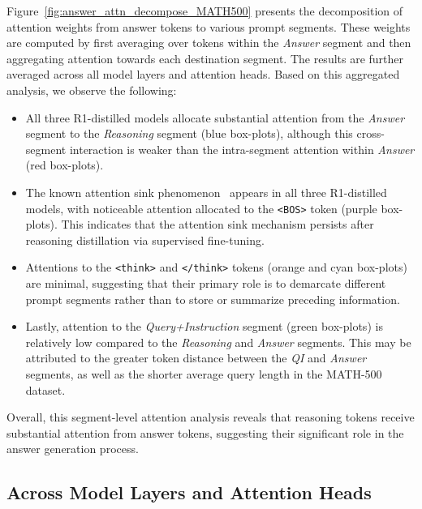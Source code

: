 \documentclass[11pt]{article}
\begin{document}
Figure~\ref{fig:answer_attn_decompose_MATH500} presents the decomposition of attention weights from answer tokens to various prompt segments. These weights are computed by first averaging over tokens within the \textit{Answer} segment and then aggregating attention towards each destination segment. The results are further averaged across all model layers and attention heads. Based on this aggregated analysis, we observe the following:

\begin{itemize}[leftmargin=5pt]
\item All three R1-distilled models allocate substantial attention from the \textit{Answer} segment to the \textit{Reasoning} segment (blue box-plots), although this cross-segment interaction is weaker than the intra-segment attention within \textit{Answer} (red box-plots).
\item The known attention sink phenomenon~\cite{xiao2024efficient, gu2025attentionsinkemergeslanguage, barbero2025llmsattendtoken} appears in all three R1-distilled models, with noticeable attention allocated to the \texttt{<BOS>} token (purple box-plots). This indicates that the attention sink mechanism persists after reasoning distillation via supervised fine-tuning.
\item Attentions to the \texttt{<think>} and \texttt{</think>} tokens (orange and cyan box-plots) are minimal, suggesting that their primary role is to demarcate different prompt segments rather than to store or summarize preceding information.
\item Lastly, attention to the \textit{Query+Instruction} segment (green box-plots) is relatively low compared to the \textit{Reasoning} and \textit{Answer} segments. This may be attributed to the greater token distance between the \textit{QI} and \textit{Answer} segments, as well as the shorter average query length in the MATH-500 dataset.
\end{itemize}

Overall, this segment-level attention analysis reveals that reasoning tokens receive substantial attention from answer tokens, suggesting their significant role in the answer generation process.

\subsection{Across Model Layers and Attention Heads}
\end{document}
